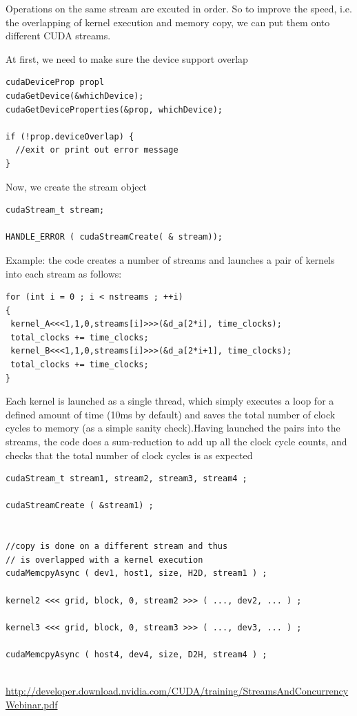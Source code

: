 Operations on the same stream are excuted in order. So to improve the speed,
i.e. the overlapping of kernel execution and memory copy, we can put them onto
different CUDA streams. 

At first, we need to make sure the device support overlap
\begin{lstlisting}
cudaDeviceProp propl
cudaGetDevice(&whichDevice);
cudaGetDeviceProperties(&prop, whichDevice);

if (!prop.deviceOverlap) {
  //exit or print out error message
}
\end{lstlisting}

Now, we create the stream object
\begin{lstlisting}
cudaStream_t stream;

HANDLE_ERROR ( cudaStreamCreate( & stream));
\end{lstlisting}

Example:  the code creates a number of streams and launches a pair of kernels
into each stream as follows:
\begin{lstlisting}
for (int i = 0 ; i < nstreams ; ++i)
{
 kernel_A<<<1,1,0,streams[i]>>>(&d_a[2*i], time_clocks);
 total_clocks += time_clocks;
 kernel_B<<<1,1,0,streams[i]>>>(&d_a[2*i+1], time_clocks);
 total_clocks += time_clocks;
}
\end{lstlisting}
Each kernel is launched as a single thread, which simply executes a loop for a defined
amount of time (10ms by default) and saves the total number of clock cycles to memory (as
a simple sanity check).Having launched the pairs into the streams, the code does a sum-reduction to add up all the
clock cycle counts, and checks that the total number of clock cycles is as expected


\begin{verbatim}
cudaStream_t stream1, stream2, stream3, stream4 ;

cudaStreamCreate ( &stream1) ;


//copy is done on a different stream and thus
// is overlapped with a kernel execution
cudaMemcpyAsync ( dev1, host1, size, H2D, stream1 ) ;

kernel2 <<< grid, block, 0, stream2 >>> ( ..., dev2, ... ) ;

kernel3 <<< grid, block, 0, stream3 >>> ( ..., dev3, ... ) ;

cudaMemcpyAsync ( host4, dev4, size, D2H, stream4 ) ;


\end{verbatim}

\url{http://developer.download.nvidia.com/CUDA/training/StreamsAndConcurrencyWebinar.pdf}



